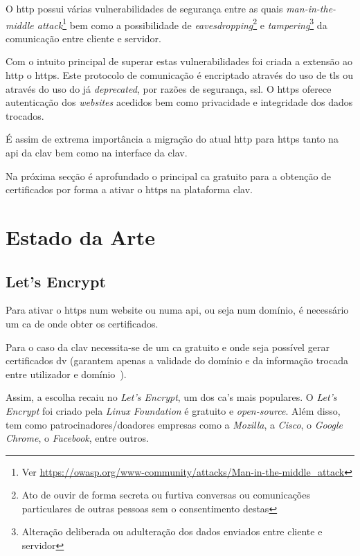 O \acrfull{http} possui várias vulnerabilidades de segurança entre as quais \textit{man-in-the-middle attack}\footnote{Ver \url{https://owasp.org/www-community/attacks/Man-in-the-middle_attack}} bem como a possibilidade de \textit{eavesdropping}\footnote{Ato de ouvir de forma secreta ou furtiva conversas ou comunicações particulares de outras pessoas sem o consentimento destas} e \textit{tampering}\footnote{Alteração deliberada ou adulteração dos dados enviados entre cliente e servidor} da comunicação entre cliente e servidor.

Com o intuito principal de superar estas vulnerabilidades foi criada a extensão ao \acrshort{http} o \acrfull{https}. Este protocolo de comunicação é encriptado através do uso de \acrfull{tls} ou através do uso do já \textit{deprecated}, por razões de segurança, \acrfull{ssl}. O \acrshort{https} oferece autenticação dos \textit{websites} acedidos bem como privacidade e integridade dos dados trocados.

É assim de extrema importância a migração do atual \acrshort{http} para \acrshort{https} tanto na \acrshort{api} da \acrshort{clav} bem como na interface da \acrshort{clav}.

Na próxima secção é aprofundado o principal \acrfull{ca} gratuito para a obtenção de certificados por forma a ativar o \acrshort{https} na plataforma \acrshort{clav}.

\section{Estado da Arte}

\subsection{Let's Encrypt}

Para ativar o \acrshort{https} num website ou numa \acrshort{api}, ou seja num domínio, é necessário um \acrfull{ca} de onde obter os certificados.

Para o caso da \acrshort{clav} necessita-se de um \acrshort{ca} gratuito e onde seja possível gerar certificados \acrfull{dv} (garantem apenas a validade do domínio e da informação trocada entre utilizador e domínio~\cite{certsTypes}).

Assim, a escolha recaiu no \textit{Let's Encrypt}, um dos \acrshort{ca}'s mais populares. O \textit{Let's Encrypt} foi criado pela \textit{Linux Foundation} é gratuito e \textit{open-source}. Além disso, tem como patrocinadores/doadores empresas como a \textit{Mozilla}, a \textit{Cisco}, o \textit{Google Chrome}, o \textit{Facebook}, entre outros. 

